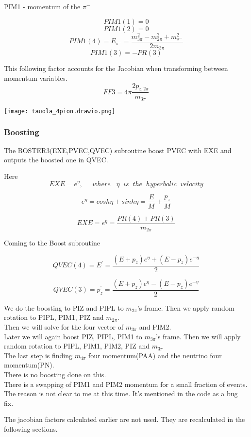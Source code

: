 \documentclass[12pt]{article}
\begin{document}
PIM1 - momentum of the $\pi^-$ 

\[PIM1(1) = 0\]
\[PIM1(2) = 0\]
\[PIM1(4) = E_{\pi^-} = \frac{m_{3\pi}^2-m_{2\pi}^2+ m_{\pi^-}^2}{2m_{3\pi}}\]
\[PIM1(3) = -PR(3)\]

This following factor accounts for the Jacobian when transforming between momentum variables.
\[FF3 = 4\pi\frac{2 p_{z,2\pi}}{m_{3\pi}}\]


\texttt{[image: tauola\_4pion.drawio.png]}

\subsubsection{Boosting}

The BOSTER3(EXE,PVEC,QVEC) subroutine boost PVEC with EXE and outputs the boosted one in QVEC.

Here \[EXE = e^\eta, \;\;\;\;\; where \;\;\; \eta \;\; is \;\;  the \;\; hyperbolic \;\; velocity\]

\[e^\eta = cosh \eta + sinh \eta = \frac{E}{M}+\frac{p_z}{M}\]


\[EXE= e^\eta  = \frac{PR(4) +PR(3)}{m_{2\pi}}\]


Coming to the Boost subroutine

\[QVEC(4) = E^{'} =  \frac{(E+p_z)e^\eta + (E-p_z)e^{-\eta}}{2}\]

\[QVEC(3) = p_z^{'} =  \frac{(E+p_z)e^\eta - (E-p_z)e^{-\eta}}{2}\]

	
We do the boosting to PIZ and PIPL to $m_{2\pi}$'s frame. Then we apply random rotation to PIPL, PIM1, PIZ and $m_{2\pi}$.\\

Then we will solve for the four vector of $m_{3\pi}$ and PIM2. \\

Later we will again boost PIZ, PIPL, PIM1 to $m_{3\pi}$'s frame. Then we will apply random rotation to PIPL, PIM1, PIM2, PIZ and $m_{3\pi}$\\

The last step is finding $m_{4\pi}$ four momentum(PAA) and the neutrino four momentum(PN).\\

There is no boosting done on this. \\

There is a swapping of PIM1 and PIM2 momentum for a small fraction of events. The reason is 
not clear to me at this time. It's mentioned in the code as a bug fix.


The jacobian factors calculated earlier are not used. They are recalculated in the following sections.
\end{document}

